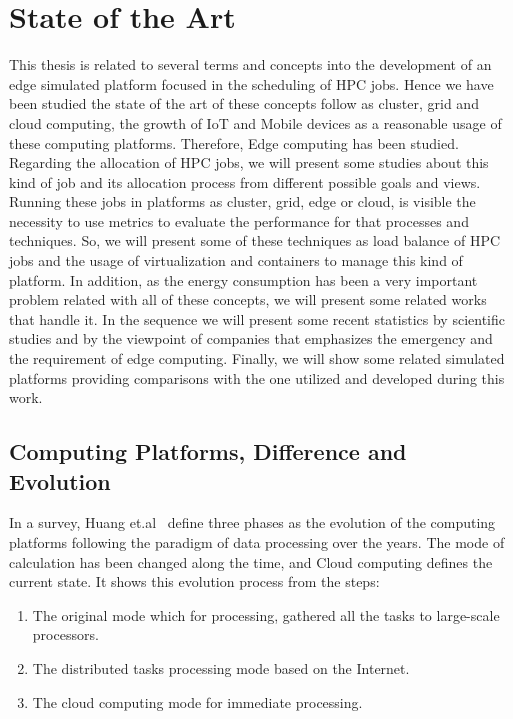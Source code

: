 \chapter{State of the Art}
\label{sec:related}

This thesis is related to several terms and concepts into the development of an edge simulated platform focused in the scheduling of HPC jobs.
Hence we have been studied the state of the art of these concepts follow as cluster, grid and cloud computing, the growth of IoT and Mobile devices as a reasonable usage of these computing platforms. Therefore, Edge computing has been studied.
Regarding the allocation of HPC jobs, we will present some studies about this kind of job and its allocation process from different possible goals and views.
Running these jobs in platforms as cluster, grid, edge or cloud, is visible the necessity to use metrics to evaluate the performance for that processes and techniques.
So, we will present some of these techniques as load balance of HPC jobs and the usage of virtualization and containers to manage this kind of platform. In addition, as the energy consumption has been a very important problem related with all of these concepts, we will present some related works that handle it.
In the sequence we will present some recent statistics by scientific studies and by the viewpoint of companies that emphasizes the emergency and the requirement of edge computing. Finally, we will show some related simulated platforms providing comparisons with the one utilized and developed during this work.

\section{Computing Platforms, Difference and Evolution}

In a survey, Huang et.al~\cite{survey_1} define three phases as the evolution of the computing platforms following the paradigm of data processing over the years.
The mode of calculation has been changed along the time, and Cloud computing defines the current state.
It shows this evolution process from the steps:

\begin{enumerate}

    \item  The original mode which for processing, gathered all the tasks to large-scale processors.
    \item  The distributed tasks processing mode based on the Internet.
    \item  The cloud computing mode for immediate processing.
    
\end{enumerate}

